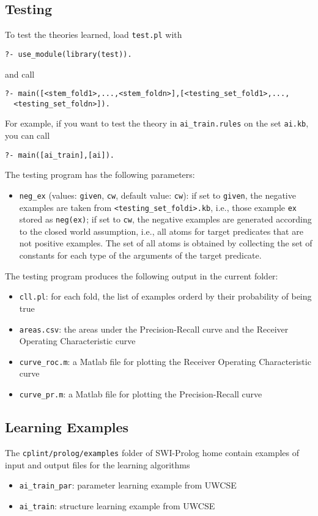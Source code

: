 \documentclass[a4paper,10pt]{article}
\begin{document}
\subsection{Testing}
To test the theories learned, load \texttt{test.pl} with 
\begin{verbatim}
?- use_module(library(test)).
\end{verbatim}
and call
\begin{verbatim}
?- main([<stem_fold1>,...,<stem_foldn>],[<testing_set_fold1>,...,
  <testing_set_foldn>]).
\end{verbatim}
For example, if you want to test the theory in \verb|ai_train.rules| on the set \verb|ai.kb|, you can call
\begin{verbatim}
?- main([ai_train],[ai]).
\end{verbatim}
The testing program has the following parameters:
\begin{itemize}
\item \verb|neg_ex| (values:  \verb|given|, \verb|cw|, default value: \verb|cw|): if  set to \verb|given|, the negative examples
are taken from \verb|<testing_set_foldi>.kb|, i.e., those example \verb|ex| stored as \verb|neg(ex)|; if set to \verb|cw|, the negative examples are generated according to the closed world assumption, i.e., all atoms for target predicates that are not positive examples. The set of all atoms is obtained by collecting the set of constants for each type of the arguments of the target predicate.
\end{itemize}
The testing program produces the following output in the current folder:
\begin{itemize}
\item \verb|cll.pl|: for each fold, the list of examples orderd by their probability of being true
\item \verb|areas.csv|: the areas under the Precision-Recall curve and the Receiver Operating Characteristic curve
\item \verb|curve_roc.m|: a Matlab file for plotting the Receiver Operating Characteristic curve
\item \verb|curve_pr.m|: a Matlab file for plotting the Precision-Recall curve
\end{itemize}


\subsection{Learning Examples}
The \verb|cplint/prolog/examples| folder of SWI-Prolog home
contain examples of input and output files for the learning algorithms
\begin{itemize}
	\item \verb|ai_train_par|: parameter learning example from UWCSE
	\item \verb|ai_train|: structure learning example from UWCSE
\end{itemize}
\end{document}
